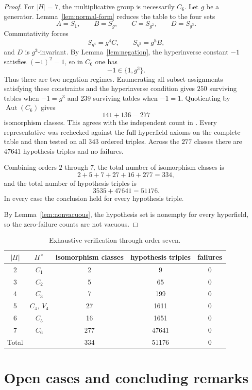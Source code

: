 \documentclass[12pt]{article}
\theoremstyle{definition}
\theoremstyle{remark}
\numberwithin{equation}{section}
\begin{document}
\begin{proof}
For \(|H|=7\), the multiplicative group is necessarily \(C_6\). Let \(g\) be a generator. Lemma~\ref{lem:normal-form} reduces the table to the four sets
\[
A=S_1,\qquad B=S_g,\qquad C=S_{g^2},\qquad D=S_{g^3}.
\]
Commutativity forces
\[
S_{g^4}=g^4C,\qquad S_{g^5}=g^5B,
\]
and \(D\) is \(g^3\)-invariant. By Lemma~\ref{lem:negation}, the hyperinverse constant \(-1\) satisfies \((-1)^2=1\), so in \(C_6\) one has
\[
-1\in\{1,g^3\}.
\]
Thus there are two negation regimes. Enumerating all subset assignments satisfying these constraints and the hyperinverse condition gives \(250\) surviving tables when \(-1=g^3\) and \(239\) surviving tables when \(-1=1\). Quotienting by \(\operatorname{Aut}(C_6)\) gives
\[
141+136=277
\]
isomorphism classes. This agrees with the independent count in \cite{Linzi}. Every representative was rechecked against the full hyperfield axioms on the complete table and then tested on all \(343\) ordered triples. Across the \(277\) classes there are \(47641\) hypothesis triples and no failures.

Combining orders \(2\) through \(7\), the total number of isomorphism classes is
\[
2+5+7+27+16+277=334,
\]
and the total number of hypothesis triples is
\[
3535+47641=51176.
\]
In every case the conclusion held for every hypothesis triple.

By Lemma~\ref{lem:nonvacuous}, the hypothesis set is nonempty for every hyperfield, so the zero-failure counts are not vacuous.
\end{proof}

\begin{table}[ht]
\centering
\begin{tabular}{|c|c|c|c|c|}
\hline
\(|H|\) & \(H^\times\) & isomorphism classes & hypothesis triples & failures\\
\hline
2 & \(C_1\) & 2 & 9 & 0\\
3 & \(C_2\) & 5 & 65 & 0\\
4 & \(C_3\) & 7 & 199 & 0\\
5 & \(C_4,\ V_4\) & 27 & 1611 & 0\\
6 & \(C_5\) & 16 & 1651 & 0\\
7 & \(C_6\) & 277 & 47641 & 0\\
\hline
Total & & 334 & 51176 & 0\\
\hline
\end{tabular}
\caption{Exhaustive verification through order seven.}
\label{tab:small}
\end{table}

\section{Open cases and concluding remarks}\label{sec:open}
\end{document}
